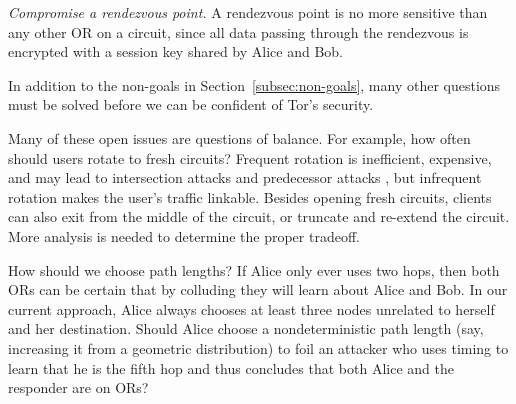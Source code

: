 \documentclass[times,10pt,twocolumn]{article}
\begin{document}
\emph{Compromise a rendezvous point.}  A rendezvous
point is no more sensitive than any other OR on
a circuit, since all data passing through the rendezvous is encrypted
with a session key shared by Alice and Bob.

\label{sec:maintaining-anonymity}
 
In addition to the non-goals in
Section~\ref{subsec:non-goals}, many other questions must be solved
before we can be confident of Tor's security.

Many of these open issues are questions of balance. For example,
how often should users rotate to fresh circuits? Frequent rotation
is inefficient, expensive, and may lead to intersection attacks and
predecessor attacks \cite{wright03}, but infrequent rotation makes the
user's traffic linkable. Besides opening fresh circuits, clients can
also exit from the middle of the circuit,
or truncate and re-extend the circuit. More analysis is
needed to determine the proper tradeoff.

%

How should we choose path lengths? If Alice only ever uses two hops,
then both ORs can be certain that by colluding they will learn about
Alice and Bob. In our current approach, Alice always chooses at least
three nodes unrelated to herself and her destination.
%
Should Alice choose a nondeterministic path length (say,
increasing it from a geometric distribution) to foil an attacker who
uses timing to learn that he is the fifth hop and thus concludes that
both Alice and the responder are on ORs?
\end{document}
